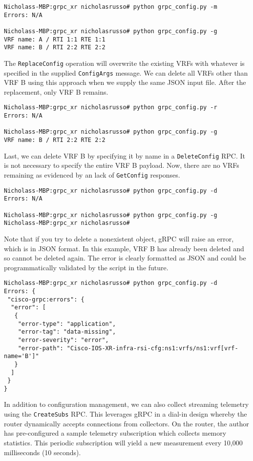 \begin{verbatim}
Nicholass-MBP:grpc_xr nicholasrusso# python grpc_config.py -m
Errors: N/A

Nicholass-MBP:grpc_xr nicholasrusso# python grpc_config.py -g
VRF name: A / RTI 1:1 RTE 1:1
VRF name: B / RTI 2:2 RTE 2:2
\end{verbatim}

The \verb|ReplaceConfig| operation will overwrite the existing VRFs with
whatever is specified in the supplied \verb|ConfigArgs| message. We can
delete all VRFs other than VRF B using this approach when we supply the
same JSON input file. After the replacement, only VRF B remains.

\begin{verbatim}
Nicholass-MBP:grpc_xr nicholasrusso# python grpc_config.py -r
Errors: N/A

Nicholass-MBP:grpc_xr nicholasrusso# python grpc_config.py -g
VRF name: B / RTI 2:2 RTE 2:2
\end{verbatim}

Last, we can delete VRF B by specifying it by name in a \verb|DeleteConfig|
RPC\@. It is not necessary to specify the entire VRF B payload. Now, there
are no VRFs remaining as evidenced by an lack of \verb|GetConfig| responses.

\begin{verbatim}
Nicholass-MBP:grpc_xr nicholasrusso# python grpc_config.py -d
Errors: N/A

Nicholass-MBP:grpc_xr nicholasrusso# python grpc_config.py -g
Nicholass-MBP:grpc_xr nicholasrusso#
\end{verbatim}

Note that if you try to delete a nonexistent object, gRPC will raise an
error, which is in JSON format. In this example, VRF B has already
been deleted and so cannot be deleted again. The error is clearly formatted
as JSON and could be programmatically validated by the script in the future.

\begin{verbatim}
Nicholass-MBP:grpc_xr nicholasrusso# python grpc_config.py -d
Errors: {
 "cisco-grpc:errors": {
  "error": [
   {
    "error-type": "application",
    "error-tag": "data-missing",
    "error-severity": "error",
    "error-path": "Cisco-IOS-XR-infra-rsi-cfg:ns1:vrfs/ns1:vrf[vrf-name='B']"
   }
  ]
 }
}
\end{verbatim}

In addition to configuration management, we can also collect streaming
telemetry using the \verb|CreateSubs| RPC\@. This leverages gRPC in a dial-in
design whereby the router dynamically accepts connections from collectors.
On the router, the author has pre-configured a sample telemetry subscription
which collects memory statistics. This periodic subscription will yield a new
measurement every 10,000 milliseconds (10 seconds).

